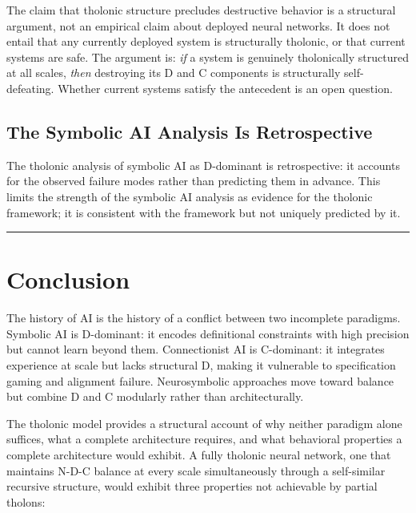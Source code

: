 \documentclass[12pt]{article}
\begin{document}
The claim that tholonic structure precludes destructive behavior is a
structural argument, not an empirical claim about deployed neural
networks. It does not entail that any currently deployed system is
structurally tholonic, or that current systems are safe. The argument
is: \emph{if} a system is genuinely tholonically structured at all
scales, \emph{then} destroying its D and C components is structurally
self-defeating. Whether current systems satisfy the antecedent is an
open question.

\subsection{The Symbolic AI Analysis Is Retrospective}\label{the-symbolic-ai-analysis-is-retrospective}

The tholonic analysis of symbolic AI as D-dominant is retrospective: it
accounts for the observed failure modes rather than predicting them in
advance. This limits the strength of the symbolic AI analysis as
evidence for the tholonic framework; it is consistent with the framework
but not uniquely predicted by it.

\begin{center}\rule{0.5\linewidth}{0.5pt}\end{center}

\section{Conclusion}\label{conclusion}

The history of AI is the history of a conflict between two incomplete
paradigms. Symbolic AI is D-dominant: it encodes definitional
constraints with high precision but cannot learn beyond them.
Connectionist AI is C-dominant: it integrates experience at scale but
lacks structural D, making it vulnerable to specification gaming and
alignment failure. Neurosymbolic approaches move toward balance but
combine D and C modularly rather than architecturally.

The tholonic model provides a structural account of why neither paradigm
alone suffices, what a complete architecture requires, and what
behavioral properties a complete architecture would exhibit. A fully
tholonic neural network, one that maintains N-D-C balance at every scale
simultaneously through a self-similar recursive structure, would exhibit
three properties not achievable by partial tholons:
\end{document}
